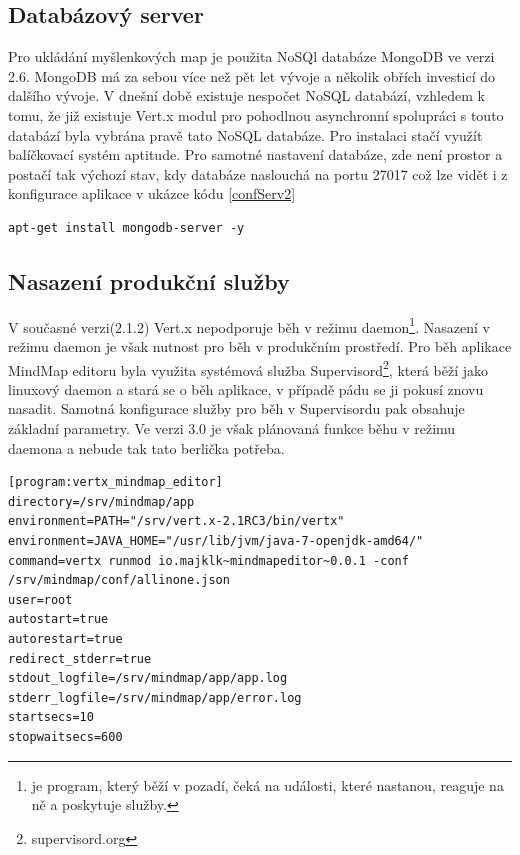 \subsection{Databázový server}

Pro ukládání myšlenkových map je použita NoSQl databáze MongoDB ve verzi 2.6. MongoDB má za sebou více než pět let vývoje a několik obřích investicí\cite{mongodb} do dalšího vývoje. V dnešní době existuje nespočet NoSQL databází, vzhledem k tomu, že již existuje Vert.x modul pro pohodlnou asynchronní spolupráci s touto databází byla vybrána pravě tato NoSQL databáze. Pro instalaci stačí využít balíčkovací systém aptitude. Pro samotné nastavení databáze, zde není prostor a postačí tak výchozí stav, kdy databáze naslouchá na portu 27017 což lze vidět i z konfigurace aplikace v ukázce kódu \ref{confServ2}

\begin{lstlisting}
apt-get install mongodb-server -y
\end{lstlisting}

\subsection{Nasazení produkční služby}\label{sub:service}

V současné verzi(2.1.2) Vert.x nepodporuje běh v režimu daemon\footnote{je program, který běží v pozadí, čeká na události, které nastanou, reaguje na ně a poskytuje služby.}. Nasazení v režimu daemon je však nutnost pro běh v produkčním prostředí. Pro běh aplikace MindMap editoru byla využita systémová služba Supervisord\footnote{supervisord.org}, která běží jako linuxový daemon a stará se o běh aplikace, v případě pádu se ji pokusí znovu nasadit. Samotná konfigurace služby pro běh v Supervisordu pak obsahuje základní parametry. Ve verzi 3.0 je však plánovaná funkce běhu v režimu daemona a nebude tak tato berlička potřeba.

\begin{lstlisting}[caption=Konfigurace produkční služby]
[program:vertx_mindmap_editor]
directory=/srv/mindmap/app
environment=PATH="/srv/vert.x-2.1RC3/bin/vertx"
environment=JAVA_HOME="/usr/lib/jvm/java-7-openjdk-amd64/"
command=vertx runmod io.majklk~mindmapeditor~0.0.1 -conf /srv/mindmap/conf/allinone.json
user=root
autostart=true
autorestart=true
redirect_stderr=true
stdout_logfile=/srv/mindmap/app/app.log
stderr_logfile=/srv/mindmap/app/error.log
startsecs=10
stopwaitsecs=600
\end{lstlisting}

